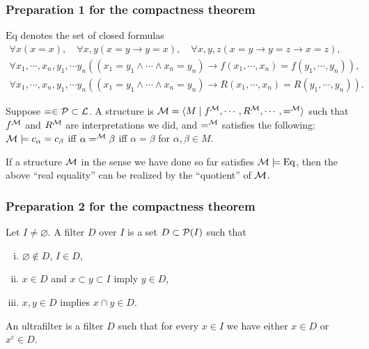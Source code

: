 \documentclass{../../small}
\begin{document}
\subsubsection*{Preparation 1 for the compactness theorem}

\begin{defn*}
$\mathrm{Eq}$ denotes the set of closed formulas
\begin{gather*}
\forall x(x=x),\quad\forall x,y(x=y\to y=x),\quad\forall x,y,z(x=y\to y=z\to x=z),\\
\forall x_1,\cdots,x_n,y_1,\cdots y_n((x_1=y_1\wedge\cdots\wedge x_n=y_n)\to f(x_1,\cdots,x_n)=f(y_1,\cdots,y_n)),\\
\forall x_1,\cdots,x_n,y_1,\cdots y_n((x_1=y_1\wedge\cdots\wedge x_n=y_n)\to R(x_1,\cdots,x_n)=R(y_1,\cdots,y_n)).
\end{gather*}
\end{defn*}


\begin{defn*}
Suppose $=\in\mathcal{P}\subset\mathcal{L}$.
A structure is $\mathcal{M}=\langle M\mid f^{\mathcal{M}},\cdots,R^{\mathcal{M}},\cdots,=^{\mathcal{M}}\rangle$ such that $f^{\mathcal{M}}$ and $R^{\mathcal{M}}$ are interpretations we did, and $=^{\mathcal{M}}$ satisfies the following:
$\mathcal{M}\models c_\alpha=c_\beta$ iff $\alpha=^{\mathcal{M}}\beta$ iff $\alpha=\beta$ for $\alpha,\beta\in M$.
\end{defn*}

If a structure $\mathcal{M}$ in the sense we have done so far satisfies $\mathcal{M}\models\mathrm{Eq}$, then the above ``real equality'' can be realized by the ``quotient'' of $\mathcal{M}$.

\subsubsection*{Preparation 2 for the compactness theorem}

\begin{defn*}
Let $I\ne\varnothing$.
A filter $D$ over $I$ is a set $D\subset\mathcal{P}(I)$ such that
\begin{enumerate}[(i)]
\item $\varnothing\notin D$, $I\in D$,
\item $x\in D$ and $x\subset y\subset I$ imply $y\in D$,
\item $x,y\in D$ implies $x\cap y\in D$.
\end{enumerate}
An ultrafilter is a filter $D$ such that for every $x\in I$ we have either $x\in D$ or $x^c\in D$.
\end{defn*}
\end{document}
